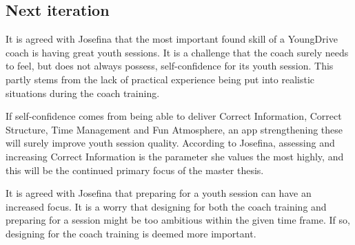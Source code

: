\subsection{Next iteration}
It is agreed with Josefina that the most important found skill of a YoungDrive coach is having great youth sessions. It is a challenge that the coach surely needs to feel, but does not always possess, self-confidence for its youth session. This partly stems from the lack of practical experience being put into realistic situations during the coach training.

If self-confidence comes from being able to deliver Correct Information, Correct Structure, Time Management and Fun Atmosphere, an app strengthening these will surely improve youth session quality. According to Josefina, assessing and increasing Correct Information is the parameter she values the most highly, and this will be the continued primary focus of the master thesis.

It is agreed with Josefina that preparing for a youth session can have an increased focus. It is a worry that designing for both the coach training and preparing for a session might be too ambitious within the given time frame. If so, designing for the coach training is deemed more important.
